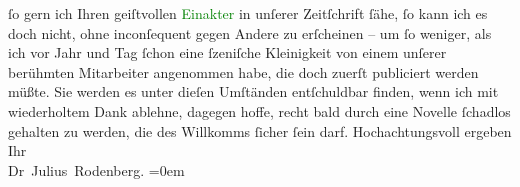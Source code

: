                     ſo gern ich Ihren geiſtvollen \textcolor{green}{Einakter}{} in unſerer Zeitſchrift ſähe, ſo kann ich es doch nicht, ohne
                    inconſequent gegen Andere zu erſcheinen – um ſo weniger, als ich vor Jahr und
                    Tag ſchon eine ſzeniſche Kleinigkeit von einem unſerer berühmten Mitarbeiter
                    angenommen habe, die doch zuerſt publiciert werden müßte. Sie werden es unter
                    dieſen Umſtänden entſchuldbar finden, wenn ich mit wiederholtem Dank ablehne,
                    dagegen hoffe, recht bald durch eine Novelle ſchadlos gehalten zu werden, die
                    des Willkomms ſicher ſein darf.\pend
           \pstart
           Hochachtungsvoll ergeben{\\[\baselineskip]}Ihr{\\[\baselineskip]}\spacefill\mbox{Dr Julius Rodenberg.}\pend
           \leftskip=0em{}\endnumbering{}  
      
